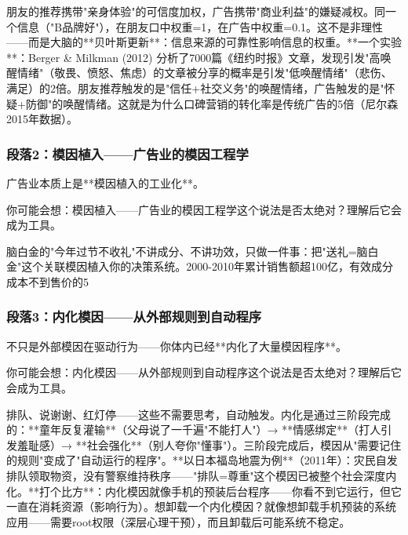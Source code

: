 \documentclass[openany, a4paper, 12pt]{book}
\newenvironment{motivation}{
	\vspace{0.5em}
	\begin{tcolorbox}[
		colback=gray!10,           %
		colframe=gray!60,          %
		title=\textit{本章动机 (Motivation)},
		fonttitle=\bfseries,
		arc=0mm,                   %
		leftrule=3mm               %
		]
		\small \itshape %
	}{
	\end{tcolorbox}
	\vspace{1em}
}
\begin{document}
\begin{motivation}
\begin{motivation}
\begin{motivation}
朋友的推荐携带"亲身体验"的可信度加权，广告携带"商业利益"的嫌疑减权。同一个信息（"B品牌好"），在朋友口中权重=1，在广告中权重=0.1。这不是非理性——而是大脑的**贝叶斯更新**：信息来源的可靠性影响信息的权重。**一个实验**：Berger & Milkman (2012) 分析了7000篇《纽约时报》文章，发现引发"高唤醒情绪"（敬畏、愤怒、焦虑）的文章被分享的概率是引发"低唤醒情绪"（悲伤、满足）的2倍。朋友推荐触发的是"信任+社交义务"的唤醒情绪，广告触发的是"怀疑+防御"的唤醒情绪。这就是为什么口碑营销的转化率是传统广告的5倍（尼尔森2015年数据）。

	\subsubsection*{段落2：模因植入——广告业的模因工程学}
广告业本质上是**模因植入的工业化**。
	\begin{tcolorbox}[colback=yellow!5, title=\textit{读者行为预测}]
		你可能会想：模因植入——广告业的模因工程学这个说法是否太绝对？理解后它会成为工具。
	\end{tcolorbox}

脑白金的"今年过节不收礼"不讲成分、不讲功效，只做一件事：把"送礼=脑白金"这个关联模因植入你的决策系统。2000-2010年累计销售额超100亿，有效成分成本不到售价的5%

	\subsubsection*{段落3：内化模因——从外部规则到自动程序}
不只是外部模因在驱动行为——你体内已经**内化了大量模因程序**。
	\begin{tcolorbox}[colback=yellow!5, title=\textit{读者行为预测}]
		你可能会想：内化模因——从外部规则到自动程序这个说法是否太绝对？理解后它会成为工具。
	\end{tcolorbox}

排队、说谢谢、红灯停——这些不需要思考，自动触发。内化是通过三阶段完成的：**童年反复灌输**（父母说了一千遍"不能打人"）→ **情感绑定**（打人引发羞耻感）→ **社会强化**（别人夸你"懂事"）。三阶段完成后，模因从"需要记住的规则"变成了"自动运行的程序"。**以日本福岛地震为例**（2011年）：灾民自发排队领取物资，没有警察维持秩序——"排队=尊重"这个模因已被整个社会深度内化。**打个比方**：内化模因就像手机的预装后台程序——你看不到它运行，但它一直在消耗资源（影响行为）。想卸载一个内化模因？就像想卸载手机预装的系统应用——需要root权限（深层心理干预），而且卸载后可能系统不稳定。


\end{motivation}
\end{motivation}
\end{motivation}
\end{document}
